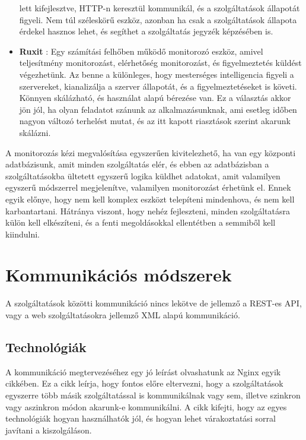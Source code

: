 \documentclass[11pt,magyar,a4paper,twoside,]{report}
\begin{document}
\begin{itemize}
  lett kifejlesztve, HTTP-n keresztül kommunikál, és a szolgáltatások
  állapotát figyeli. Nem túl széleskörű eszköz, azonban ha csak a
  szolgáltatások állapota érdekel hasznos lehet, és segíthet a
  szolgáltatás jegyzék képzésében is.
\item
  \textbf{Ruxit}\citep{ruxit-overview} \citep{ruxit-monitoring}: Egy
  számítási felhőben működő monitorozó eszköz, amivel teljesítmény
  monitorozást, elérhetőség monitorozást, és figyelmeztetés küldést
  végezhetünk. Az benne a különleges, hogy mesterséges intelligencia
  figyeli a szervereket, kianalizálja a szerver állapotát, és a
  figyelmeztetéseket is követi. Könnyen skálázható, és használat alapú
  bérezése van. Ez a választás akkor jön jól, ha olyan feladatot szánunk
  az alkalmazásunknak, ami esetleg időben nagyon változó terhelést
  mutat, és az itt kapott riasztások szerint akarunk skálázni.
\end{itemize}

A monitorozás kézi megvalósítása egyszerűen kivitelezhető, ha van egy
központi adatbázisunk, amit minden szolgáltatás elér, és ebben az
adatbázisban a szolgáltatásokba ültetett egyszerű logika küldhet
adatokat, amit valamilyen egyszerű módszerrel megjelenítve, valamilyen
monitorozást érhetünk el. Ennek egyik előnye, hogy nem kell komplex
eszközt telepíteni mindenhova, és nem kell karbantartani. Hátránya
viszont, hogy nehéz fejleszteni, minden szolgáltatásra külön kell
elkészíteni, és a fenti megoldásokkal ellentétben a semmiből kell
kiindulni.

\section{Kommunikációs
módszerek}\label{kommunikuxe1ciuxf3s-muxf3dszerek}

A szolgáltatások közötti kommunikáció nincs lekötve de jellemző a
REST-es API, vagy a web szolgáltatásokra jellemző XML alapú
kommunikáció\citep{rest-soap}.

\subsection{Technológiák}\label{technoluxf3giuxe1k}

A kommunikáció megtervezéséhez egy jó leírást olvashatunk az Nginx egyik
cikkében\citep{micro-communication}. Ez a cikk leírja, hogy fontos előre
eltervezni, hogy a szolgáltatások egyszerre több másik szolgáltatással
is kommunikálnak vagy sem, illetve szinkron vagy aszinkron módon
akarunk-e kommunikálni. A cikk kifejti, hogy az egyes technológiák
hogyan használhatók jól, és hogyan lehet várakoztatási sorral javítani a
kiszolgáláson.
\end{document}
